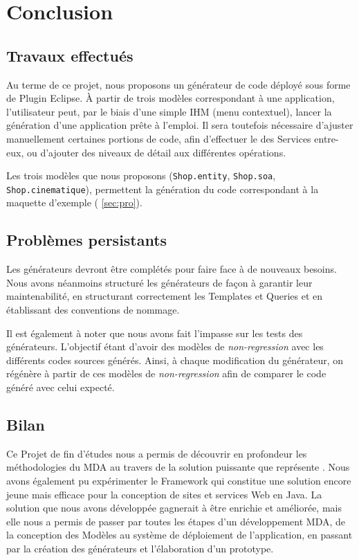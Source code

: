 \chapter{Conclusion}\label{chap:COnc}


\section{Travaux effectués}

Au terme de ce projet, nous proposons un générateur de code déployé sous forme de Plugin Eclipse. À partir de trois modèles correspondant à une application, l'utilisateur peut, par le biais d'une simple IHM (menu contextuel), lancer la génération d'une application \kwplay prête à l'emploi. Il sera toutefois nécessaire d'ajuster manuellement certaines portions de code, afin d'effectuer le  des Services entre-eux, ou d'ajouter des niveaux de détail aux différentes opérations.

Les trois modèles que nous proposons (\verb+Shop.entity+, \verb+Shop.soa+, \verb+Shop.cinematique+), permettent la génération du code correspondant à la maquette d'exemple (\cf{} \ref{sec:pro}).

\section{Problèmes persistants}

Les générateurs devront être complétés pour faire face à de nouveaux besoins. Nous avons néanmoins structuré les générateurs de façon à garantir leur maintenabilité, en structurant correctement les Templates et Queries et en établissant des conventions de nommage.


Il est également à noter que nous avons fait l'impasse sur les tests des générateurs. L'objectif étant d'avoir des modèles de \emph{non-regression} avec les différents codes sources générés. Ainsi, à chaque modification du générateur, on régénère à partir de ces modèles de \emph{non-regression} afin de comparer le code généré avec celui expecté.

\section{Bilan}

Ce Projet de fin d'études nous a permis de découvrir en profondeur les méthodologies du MDA au travers de la solution puissante que représente \kwacceleo. Nous avons également pu expérimenter le Framework \kwplay qui constitue une solution encore jeune mais efficace pour la conception de sites et services Web en Java. La solution que nous avons développée gagnerait à être enrichie et améliorée, mais elle nous a permis de passer par toutes les étapes d'un développement MDA, de la conception des Modèles au système de déploiement de l'application, en passant par la création des générateurs et l'élaboration d'un prototype.

